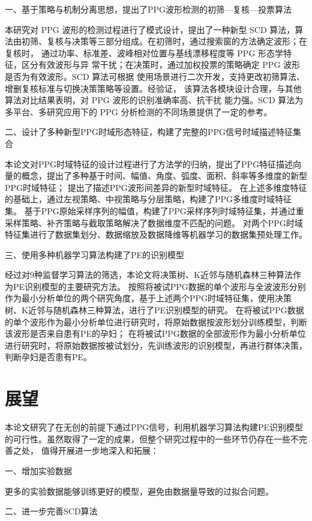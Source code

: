 一、基于策略与机制分离思想，提出了PPG波形检测的初筛—复核—投票算法

本研究对 PPG 波形的检测过程进行了模式设计，提出了一种新型 SCD 算法，算
法由初筛、复核与决策等三部分组成。在初筛时，通过搜索窗的方法确定波形；在复核时，
通过功率、标准差、波峰相对位置与基线漂移程度等 PPG 形态学特征，区分有效波形与异
常干扰；在决策时，通过加权投票的策略确定 PPG 波形是否为有效波形。SCD 算法可根据
使用场景进行二次开发，支持更改初筛算法、增删复核标准与切换决策策略等设置。经验证，
该算法各模块设计合理，与其他算法对比结果表明，对 PPG 波形的识别准确率高、抗干扰
能力强。SCD 算法为多平台、多研究应用下的 PPG 分析检测的不同场景提供了一定的参考。

二、设计了多种新型PPG时域形态特征，构建了完整的PPG信号时域描述特征集合

本论文对PPG时域特征的设计过程进行了方法学的归纳，提出了PPG特征描述向量的概念，提出了多种基于时间、幅值、角度、弧度、面积、斜率等多维度的新型PPG时域特征；
提出了描述PPG波形间差异的新型时域特征。
在上述多维度特征的基础上，通过左视策略、中视策略与分层策略，构建了PPG多维度时域特征集。
基于PPG原始采样序列的幅值，构建了PPG采样序列时域特征集，并通过重采样策略、补齐策略与截取策略解决了数据维度不匹配的问题。
对两个PPG时域特征集进行了数据集划分、数据缩放及数据降维等机器学习的数据集预处理工作。


三、使用多种机器学习算法构建了PE的识别模型

经过对9种监督学习算法的筛选，本论文将决策树、K近邻与随机森林三种算法作为PE识别模型的主要研究方法。
按照将被试PPG数据的单个波形与全波波形分别作为最小分析单位的两个研究角度，基于上述两个PPG时域特征集，使用决策树、K近邻与随机森林三种算法，进行了PE识别模型的研究。
在将被试PPG数据的单个波形作为最小分析单位进行研究时，将原始数据按波形划分训练模型，判断该波形是否来自患有PE的孕妇；
在将被试PPG数据的全部波形作为最小分析单位进行研究时，将原始数据按被试划分，先训练波形的识别模型，再进行群体决策，判断孕妇是否患有PE。

\section{展望}

本论文研究了在无创的前提下通过PPG信号，利用机器学习算法构建PE识别模型的可行性。虽然取得了一定的成果，但整个研究过程中的一些环节仍存在一些不完善之处，
值得开展进一步地深入和拓展：

一、增加实验数据

更多的实验数据能够训练更好的模型，避免由数据量导致的过拟合问题。

二、进一步完善SCD算法

